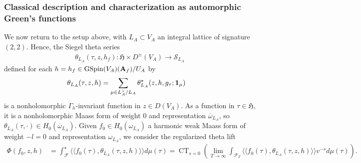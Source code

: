 \documentclass{amsart}
\theoremstyle{definition}
\begin{document}
\subsubsection{Classical description and characterization as automorphic Green's functions} 

We now return to the setup above, with $L_A \subset V_A$ an integral lattice of signature $(2,2)$. Hence, the Siegel theta series 
\begin{align*} \theta_{L_A}(\tau, z, h_f): \mathfrak{H} \times D^{\pm}(V_A) \longrightarrow \mathcal{S}_{L_A}\end{align*}
defined for each $h = h_f \in \operatorname{GSpin}(V_A)({\bf{A}}_f)/U_A$ by
\begin{align*} \theta_{L_A}(\tau, z, h) &= \sum\limits_{ \mu \in L_A^{\vee}/L_A }\theta_{L_A}^{\star}(z, h, g_{\tau}; {\bf{1}}_{\mu})\end{align*}
is a nonholomorphic $\Gamma_h$-invariant function in $z \in D(V_A)$.
As a function in $\tau \in \mathfrak{H}$, it is a nonholomorphic Maass form of weight $0$
and representation $\overline{\omega}_{L_A}$, so $\theta_{L_A}(\tau, \cdot) \in H_0(\overline{\omega}_{L_A})$.
Given $f_0 \in H_{0}(\omega_{L_A})$ a harmonic weak Maass form of weight $-l=0$ and representation $\omega_{L_A}$, we consider the regularized theta lift 
\begin{align*} \Phi(f_0, z, h) 
&= \int_{\mathcal{F}}^{\star} \langle \langle f_0(\tau), \theta_{L_A} (\tau, z, h) \rangle \rangle d \mu(\tau)
= \operatorname{CT}_{s=0} \left(\lim_{T \rightarrow \infty} \int_{\mathcal{F}_T} \langle \langle f_0(\tau), \theta_{L_A} (\tau, z, h) \rangle \rangle v^{-s} d \mu(\tau) \right). \end{align*}
\end{document}
